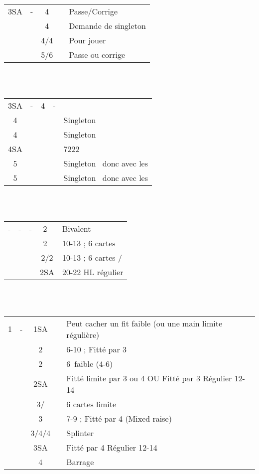 \documentclass[a4paper, oneside, 11pt]{report}
\begin{document}
	\begin{tabular}{cccc|l}
	3SA & - & 4\trefle && Passe/Corrige\\
	&& 4\carreau && Demande de singleton\\
	&& 4\coeur/4\pique && Pour jouer\\
	&& 5\trefle/6\trefle && Passe ou corrige\\
	\end{tabular}\\\\
	
	\begin{tabular}{cccc|l}
	3SA & - & 4\carreau & - &\\
	4\coeur &&&& Singleton \coeur\\
	4\pique &&&& Singleton \pique\\
	4SA &&&& 7222\\
	5\trefle &&&& Singleton \carreau\ donc avec les \trefle\\
	5\carreau &&&& Singleton \trefle\ donc avec les \carreau\\
	\end{tabular}\\\\

	\begin{tabular}{cccc|l}
	- & - & - & 2\trefle\ & Bivalent\\
	&&& 2\carreau\ & 10-13 ; 6 cartes \carreau\\
	&&& 2\coeur/2\pique & 10-13 ; 6 cartes \coeur/\pique\\
	&&& 2SA & 20-22 HL régulier\\
	\end{tabular}\\\\
	
		\begin{tabular}{cccc|l}
		1\coeur & - & 1SA && Peut cacher un fit faible (ou une main limite régulière)\\
		&& 2\coeur && 6-10 ; Fitté par 3\\
		&& 2\pique && 6\pique\ faible (4-6)\\
		&& 2SA && Fitté limite par 3 ou 4 OU Fitté par 3 Régulier 12-14  \\
		&& 3\trefle/\carreau && 6 cartes limite\\
		&& 3\coeur && 7-9 ; Fitté par 4 (Mixed raise)\\
		&& 3\pique/4\trefle/4\carreau && Splinter\\
		&& 3SA && Fitté par 4 Régulier 12-14\\
		&& 4\coeur && Barrage\\
		\end{tabular}\\
\end{document}
